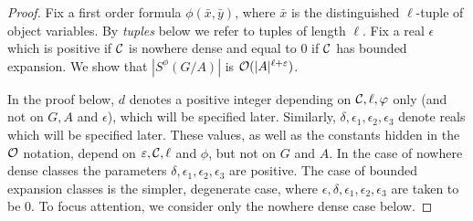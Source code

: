 \begin{proof}
%
	
 
	
  Fix a first order formula $\phi(\bar x,\bar y)$, where $\bar x$ is the distinguished $\ell$-tuple of object variables.
    By \emph{tuples} below we refer to tuples of length $\ell$.
	   Fix a real $\epsilon$ which is positive if $\cal C$
	   is nowhere dense and equal to $0$ if $\cal C$ has bounded expansion.	   
	   We show that $|S^\phi(G/A)|$ is $\Oof(|A|^{\ell+\epsilon})$.
	   \medskip
	   
	   
	   
In the proof below, $d$ denotes a positive integer 
depending on ${\cal C},\ell,\phi$ only (and not on $G, A$ and $\epsilon$), which will be specified later.
Similarly, $\delta,\epsilon_1,\epsilon_2,\epsilon_3$ denote  reals which 
will be specified later.
These values, as well as the constants hidden in the $\Oof$ notation, depend
 on $\epsilon,\cal C, \ell$ and $\phi$, but not on $G$ and $A$.
 In the case of nowhere dense classes the  parameters $\delta,\epsilon_1,\epsilon_2,\epsilon_3$ are positive. The case of bounded expansion classes is the simpler, degenerate  case, where $\epsilon,\delta,\epsilon_1,\epsilon_2,\epsilon_3$  are taken to be $0$. To focus attention, we consider only the nowhere dense case below.
 

\end{proof}
